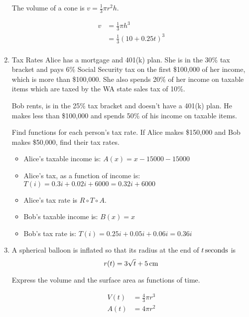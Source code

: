 \documentclass{exam}
\begin{document}
\begin{enumerate}
    The volume of a cone is $v = \frac{1}{3} \pi r^2 h$.

    \begin{solution}
      \begin{align*}
         v &= \frac{1}{3} \pi h^3 \\
       &= \frac{1}{3} (10 + 0.25t)^3 \\
      \end{align*}
    \end{solution}

  \item Tax Rates
    Alice has a mortgage and 401(k) plan.  She is in the 30\% tax bracket and pays 6\% Social Security tax on the first
    \$100,000 of her income, which is more than \$100,000.  She also spends 20\% of her income on taxable items which
    are taxed by the WA state sales tax of 10\%.

    Bob rents, is in the 25\% tax bracket and doesn't have a 401(k) plan.  He makes less than \$100,000 and spends 50\%
    of his income on taxable items.

    Find functions for each person's tax rate.  If Alice makes \$150,000 and Bob makes \$50,000, find their tax rates.

    \begin{solution}
      \begin{itemize}
        \item Alice's taxable income is: $A(x) = x - 15000 - 15000$
        \item Alice's tax, as a function of income is: $T(i) = 0.3i + 0.02i + 6000 = 0.32i + 6000$
        \item Alice's tax rate is $R \circ T \circ A$.
        \item Bob's taxable income is: $B(x) = x$
        \item Bob's tax rate is: $T(i) = 0.25i + 0.05i + 0.06i = 0.36i$
      \end{itemize}

    \end{solution}
    
  \item A spherical balloon is inflated so that its radius at the end of $\unit[t]{seconds}$ is 
    \[
      r(t) = \unit[3 \sqrt{t} + 5]{cm}
    \]

    Express the volume and the surface area as functions of time.

    \begin{solution}
      \begin{align*}
        V(t) &= \frac{4}{3} \pi r^3 \\
        A(t) &= 4 \pi r^2 \\
      \end{align*}
    \end{solution}

\end{enumerate}
\end{document}
